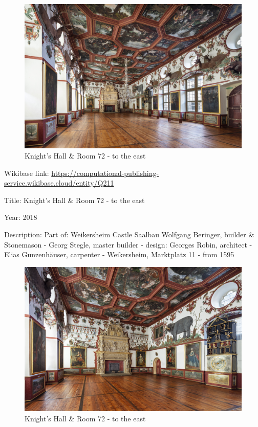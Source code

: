 \documentclass[
  letterpaper,
]{book}
\begin{document}
\begin{figure}[H]

{\centering \includegraphics{impressum_files/mediabag/fmd10005859a.jpg}

}

\caption{Knight's Hall \& Room 72 - to the east}

\end{figure}%

Wikibase link:
\url{https://computational-publishing-service.wikibase.cloud/entity/Q211}

Title: Knight's Hall \& Room 72 - to the east

Year: 2018

Description: Part of: Weikersheim Castle Saalbau Wolfgang Beringer,
builder \& Stonemason - Georg Stegle, master builder - design: Georges
Robin, architect - Elias Gunzenhäuser, carpenter - Weikersheim,
Marktplatz 11 - from 1595

\begin{figure}[H]

{\centering \includegraphics{impressum_files/mediabag/fmd10005860a.jpg}

}

\caption{Knight's Hall \& Room 72 - to the east}

\end{figure}%
\end{document}
